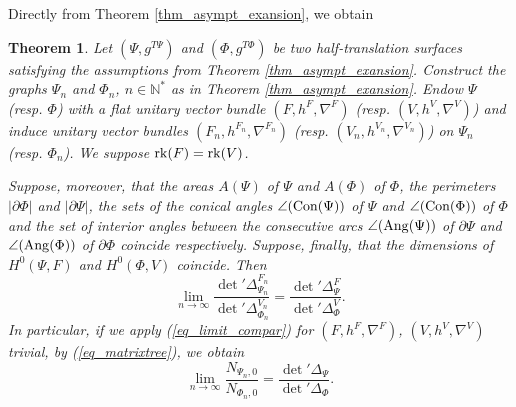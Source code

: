 \documentclass[12pt]{article}
\numberwithin{equation}{section}
\theoremstyle{theorem}
\newtheorem{thm}{Theorem}[section]
\theoremstyle{definition}
\theoremstyle{remark}
\newcommand{\nat}{\mathbb{N}}
\newcommand{\laplcomp}{\Delta}
\newcommand{\rk}[1]{{\rm{rk}} ( #1 )}
\begin{document}
	Directly from Theorem \ref{thm_asympt_exansion}, we obtain
	\begin{thm}\label{thm_rel_as_compexity}
		Let $(\Psi, g^{T \Psi})$  and $(\Phi, g^{T \Phi})$  be two \textit{half-translation} surfaces satisfying the assumptions from Theorem \ref{thm_asympt_exansion}.
		Construct the graphs $\Psi_n$ and $\Phi_n$, $n \in \nat^*$ as in Theorem \ref{thm_asympt_exansion}.
		Endow $\Psi$ (resp. $\Phi$) with a flat unitary vector bundle $(F, h^F, \nabla^F)$ (resp. $(V, h^V, \nabla^V)$) and induce unitary vector bundles $(F_n, h^{F_n}, \nabla^{F_n})$ (resp. $(V_n, h^{V_n}, \nabla^{V_n})$) on $\Psi_n$ (resp. $\Phi_n$). 
		We suppose $\rk{F} = \rk{V}$.
		\par 
		Suppose, moreover, that the areas $A(\Psi)$ of $\Psi$ and $A(\Phi)$ of $\Phi$, the perimeters $|\partial \Phi|$ and $|\partial \Psi|$, the sets of the conical angles $\angle({\rm{Con}}(\Psi))$ of $\Psi$ and  $\angle({\rm{Con}}(\Phi))$ of $\Phi$ and the set of interior angles between the consecutive arcs  $\angle({\rm{Ang}}(\Psi))$ of $\partial \Psi$ and  $\angle({\rm{Ang}}(\Phi))$ of $\partial \Phi$ coincide respectively. Suppose, finally, that  the dimensions of $H^0(\Psi, F)$ and $H^0(\Phi, V)$ coincide.
		Then
		\begin{equation}\label{eq_limit_compar}
			\lim_{n \to \infty} \frac{\det{}'\laplcomp_{\Psi_n}^{F_n}}{\det{}' \laplcomp_{\Phi_n}^{V_n}} = \frac{\det{}' \laplcomp_{\Psi}^{F}}{\det{}' \laplcomp_{\Phi}^{V}}.
		\end{equation}
		In particular, if we apply (\ref{eq_limit_compar}) for $(F, h^F, \nabla^F)$, $(V, h^V, \nabla^V)$ trivial, by (\ref{eq_matrixtree}), we obtain
		\begin{equation}\label{eq_limit_compar2}
			\lim_{n \to \infty} \frac{N_{\Psi_n, 0}}{N_{\Phi_n, 0}} = \frac{\det{}' \laplcomp_{\Psi}}{\det{}' \laplcomp_{\Phi}}.
		\end{equation}
	\end{thm}
\end{document}
